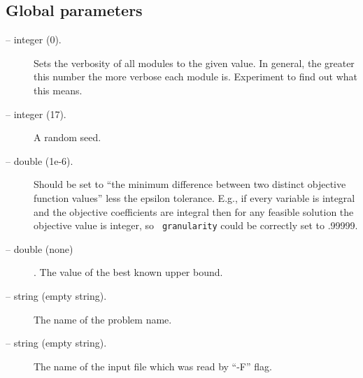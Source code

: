 \subsection{Global parameters}
\begin{description}
\item[ -- integer (0).] 
Sets the verbosity of all modules to the given value. In general,
the greater this number the more verbose each module is. Experiment
to find out what this means.

\item[ -- integer (17).] 
A random seed.

\item[ -- double (1e-6).]
Should be set to ``the minimum difference between two distinct
objective function values'' less the epsilon tolerance. E.g., if every
variable is integral and the objective coefficients are integral then
for any feasible solution the objective value is integer, so {\tt
granularity} could be correctly set to .99999.

\item[ -- double (none)]. 
The value of the best known upper bound.

\item[ -- string (empty string).]
The name of the problem name.

\item[ -- string (empty string).]
The name of the input file which was read by ``-F'' flag.

\end{description}

